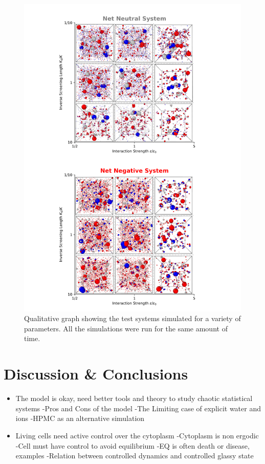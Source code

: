 \documentclass[a4paper,11pt,oneside]{book}
\begin{document}
\begin{figure}[!htbp]
\centering
\includegraphics[width=0.7\linewidth]{files/Fig9-b4858396f6517661b798f42ca198a015.png}
\caption[]{Qualitative graph showing the test systems simulated for a variety of parameters. All the simulations were run for the same amount of time.}
\label{Fig9ParamScan}
\end{figure}

\section{Discussion \& Conclusions}

\begin{itemize}
\item The model is okay, need better tools and theory to study chaotic statistical systems\newline
-Pros and Cons of the model\newline
-The Limiting case of explicit water and ions\newline
-HPMC as an alternative simulation


\item Living cells need active control over the cytoplasm\newline
-Cytoplasm is non ergodic\newline
-Cell must have control to avoid equilibrium\newline
-EQ is often death or disease, examples\newline
-Relation between controlled dynamics and controlled glassy state
\end{itemize}
\end{document}

